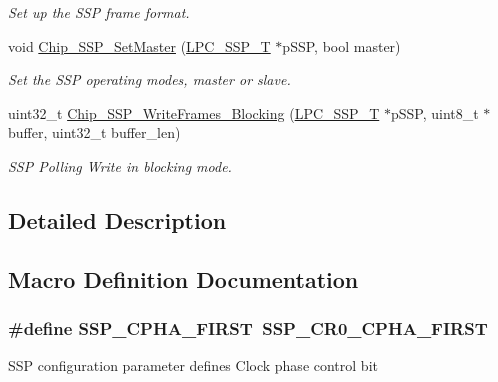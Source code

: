 \begin{DoxyCompactItemize}
\begin{DoxyCompactList}\small\item\em Set up the S\+SP frame format. \end{DoxyCompactList}\item 
void \hyperlink{group__SSP__17XX__40XX_ga60e601329b0aa6afe5f355dc6e8f84bd}{Chip\+\_\+\+S\+S\+P\+\_\+\+Set\+Master} (\hyperlink{structLPC__SSP__T}{L\+P\+C\+\_\+\+S\+S\+P\+\_\+T} $\ast$p\+S\+SP, bool master)
\begin{DoxyCompactList}\small\item\em Set the S\+SP operating modes, master or slave. \end{DoxyCompactList}\item 
uint32\+\_\+t \hyperlink{group__SSP__17XX__40XX_gae64bd476b75c03d0b952f08ea42a09be}{Chip\+\_\+\+S\+S\+P\+\_\+\+Write\+Frames\+\_\+\+Blocking} (\hyperlink{structLPC__SSP__T}{L\+P\+C\+\_\+\+S\+S\+P\+\_\+T} $\ast$p\+S\+SP, uint8\+\_\+t $\ast$buffer, uint32\+\_\+t buffer\+\_\+len)
\begin{DoxyCompactList}\small\item\em S\+SP Polling Write in blocking mode. \end{DoxyCompactList}\end{DoxyCompactItemize}


\subsection{Detailed Description}


\subsection{Macro Definition Documentation}
\subsubsection[{\texorpdfstring{S\+S\+P\+\_\+\+C\+P\+H\+A\+\_\+\+F\+I\+R\+ST}{SSP_CPHA_FIRST}}]{\setlength{\rightskip}{0pt plus 5cm}\#define S\+S\+P\+\_\+\+C\+P\+H\+A\+\_\+\+F\+I\+R\+ST~{\bf S\+S\+P\+\_\+\+C\+R0\+\_\+\+C\+P\+H\+A\+\_\+\+F\+I\+R\+ST}}\hypertarget{group__SSP__17XX__40XX_ga6333b5eaf9d5301431fc0399c0d417d5}{}\label{group__SSP__17XX__40XX_ga6333b5eaf9d5301431fc0399c0d417d5}
S\+SP configuration parameter defines Clock phase control bit 

